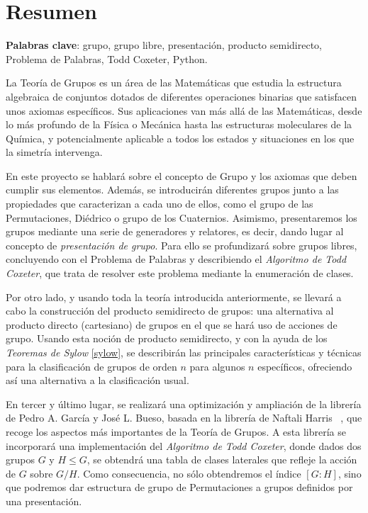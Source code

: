 %

\newpage
\blankpage
\chapter*{Resumen}


\textbf{Palabras clave}: grupo, grupo libre, presentación, producto semidirecto, Problema de Palabras,  Todd Coxeter, Python.

\vspace{0.5cm}

La Teoría de Grupos es un área de las Matemáticas que estudia la estructura algebraica de conjuntos dotados de diferentes operaciones binarias que satisfacen unos axiomas específicos. Sus aplicaciones van más allá de las Matemáticas, desde lo más profundo de la Física o Mecánica hasta las estructuras moleculares de la Química, y potencialmente aplicable a todos los estados y situaciones en los que la simetría intervenga.

En este proyecto se hablará sobre el concepto de Grupo y los axiomas que deben cumplir sus elementos. Además, se introducirán diferentes grupos junto a las propiedades que caracterizan a cada uno de ellos, como el grupo de las Permutaciones, Diédrico o grupo de los Cuaternios. Asimismo, presentaremos los grupos mediante una serie de 
 generadores y relatores, es decir, dando lugar al concepto de \textit{presentación de grupo}. Para ello se profundizará sobre  grupos libres, concluyendo con el Problema de Palabras y describiendo el \textit{Algoritmo de Todd Coxeter}, que trata de resolver este problema mediante la enumeración de clases.

Por otro lado, y usando toda la teoría introducida anteriormente, se llevará a cabo la construcción del producto semidirecto de grupos: una alternativa al producto directo (cartesiano) de grupos en el que se hará uso de acciones de grupo. Usando esta noción de producto semidirecto, y con la ayuda de los \textit{Teoremas de Sylow} \ref{sylow}, se describirán las principales características y técnicas para la clasificación de grupos de orden $n$ para algunos $n$ específicos, ofreciendo así una alternativa a la clasificación usual.

En tercer y último lugar, se realizará una optimización y ampliación de la librería de Pedro A. García y José L. Bueso, basada en la librería de Naftali Harris ~\cite{Absalg}, que recoge los aspectos más importantes de la Teoría de Grupos.  
A esta librería se incorporará una implementación del \textit{Algoritmo de Todd Coxeter}, donde dados dos grupos $G$ y $H\leq G$, se obtendrá una tabla de clases laterales que refleje la acción de $G$ sobre $G/H$. Como consecuencia, no sólo obtendremos el índice $[G:H]$, sino que podremos dar estructura de grupo de Permutaciones a grupos definidos por una presentación. 


